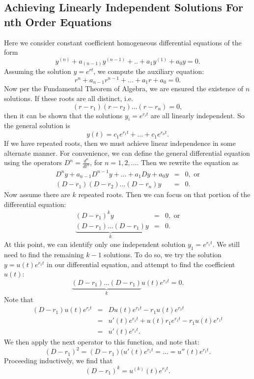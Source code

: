 \documentclass[10pt]{article}
\begin{document}
    \subsection{Achieving Linearly Independent Solutions For nth Order Equations}
    Here we consider constant coefficient homogeneous differential equations of the form 
    $$y^{(n)}+a_{(n-1)}y^{(n-1)}+..+a_1 y^{(1)}+a_0 y=0.$$
    Assuming the solution $y=e^{rt}$, we compute the auxiliary equation: $$r^n +a_{n-1} r^{n-1} +...+a_1r+a_0 =0.$$
    Now per the Fundamental Theorem of Algebra, we are ensured the existence of $n$ solutions. If these roots are all distinct, i.e. $$(r-r_1)(r-r_2)...(r-r_n)=0,$$
    then it can be shown that the solutions $y_i=e^{r_i t}$ are all linearly independent. So the general solution is $$y(t)=c_1 e^{r_1 t}+...+c_1 e^{r_n t}.$$
    If we have repeated roots, then we must achieve linear independence in some alternate manner. For convenience, we can define the general differential equation using the operators $D^n =\frac{d^n}{dt^n}$, for $n=1,2,...$. Then we rewrite the equation as
    \begin{eqnarray*}
        D^n y+a_{n-1}D^{n-1}y+...+a_1 Dy+a_0 y&=&0, \text{ or}\\
        (D-r_1)(D-r_2)...(D-r_n)y&=&0.
    \end{eqnarray*}
    Now assume there are $k$ repeated roots. Then we can focus on that portion of the differential equation:
    \begin{eqnarray*}
        (D-r_1)^k y &=& 0, \text{ or}\\
        \underbrace{(D-r_1)...(D-r_1)}_k y&=&0.
    \end{eqnarray*}
    At this point, we can identify only one independent solution $y_1=e^{r_1 t}$. We still need to find the remaining $k-1$ solutions. To do so, we try the solution $y=u(t)e^{r_1 t}$ in our differential equation, and attempt to find the coefficient $u(t)$:
    $$\underbrace{(D-r_1)...(D-r_1)}_k u(t)e^{r_1 t} =0.$$
    Note that
    \begin{eqnarray*}
        (D-r_1)u(t)e^{r_i t} &=& Du(t)e^{r_1 t}-r_1 u(t)e^{r_1 t}\\
        &=& u'(t)e^{r_1 t}+u(t)r_1e^{r_1 t}-r_1 u(t)e^{r_1 t}\\
        &=&u'(t)e^{r_1 t}.
    \end{eqnarray*}
    We then apply the next operator to this function, and note that:
    $$(D-r_1)^2 = (D-r_1)(u'(t)e^{r_1 t}=...=u''(t)e^{r_1 t}.$$
    Proceeding inductively, we find that
    $$(D-r_1)^k = u^{(k)}(t)e^{r_1 t}.$$
\end{document}
